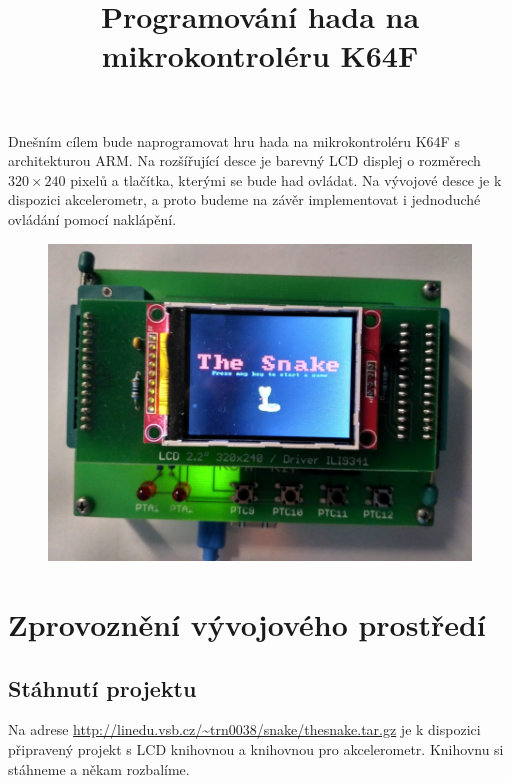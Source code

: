 \documentclass[12pt]{article}
\title{Programování hada na mikrokontroléru K64F}
\date{}
\begin{document}
\sloppy
\maketitle

Dnešním cílem bude naprogramovat hru hada na mikrokontroléru K64F s architekturou ARM.
Na rozšířující desce je barevný LCD displej o rozměrech $320 \times 240$ pixelů a tlačítka, kterými se bude had ovládat.
Na vývojové desce je k dispozici akcelerometr, a proto budeme na závěr implementovat i jednoduché ovládání pomocí naklápění.

\begin{figure}[h]
\includegraphics[width=\linewidth]{figures/snake}
\end{figure}




\section{Zprovoznění vývojového prostředí}
\subsection{Stáhnutí projektu}
Na adrese \url{http://linedu.vsb.cz/~trn0038/snake/thesnake.tar.gz} je k dispozici připravený projekt s LCD knihovnou a knihovnou pro akcelerometr.
Knihovnu si stáhneme a někam rozbalíme.
\end{document}
